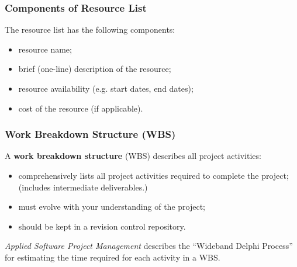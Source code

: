 \begin{frame}
\frametitle{Components of Resource List}

\begin{changemargin}{1cm}

The resource list has the following components:
\begin{itemize}
\item resource name;
\item brief (one-line) description of the resource; 
\item resource availability (e.g. start dates, end dates);
\item cost of the resource (if applicable).
\end{itemize}

\end{changemargin}

\end{frame}

\begin{frame}
\frametitle{Work Breakdown Structure (WBS)}

\begin{changemargin}{1cm}
A {\bf work breakdown structure} (WBS) describes all project
activities:

\begin{itemize}
\item comprehensively lists all project activities
required to complete the project;\\

(includes intermediate deliverables.)

\item must evolve with your understanding of the project;

\item should be kept in a revision control repository.
\end{itemize}

\emph{Applied Software Project Management} describes the
``Wideband Delphi Process'' for estimating the time required for each
activity in a WBS.
\end{changemargin}

\end{frame}

